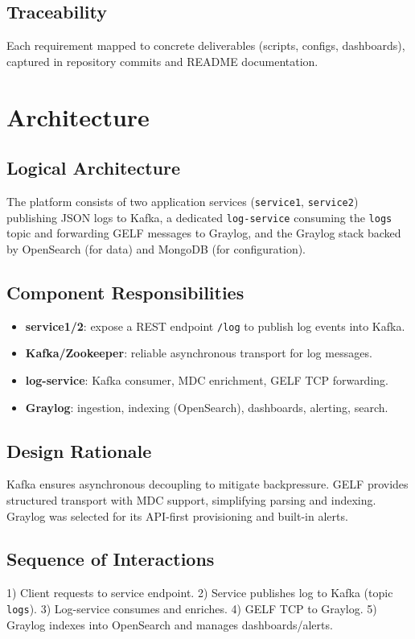 \documentclass[12pt,a4paper]{report}
\begin{document}
\section{Traceability}
Each requirement mapped to concrete deliverables (scripts, configs, dashboards), captured in repository commits and README documentation.

\chapter{Architecture}
\section{Logical Architecture}
The platform consists of two application services (\texttt{service1}, \texttt{service2}) publishing JSON logs to Kafka, a dedicated \texttt{log-service} consuming the \texttt{logs} topic and forwarding GELF messages to Graylog, and the Graylog stack backed by OpenSearch (for data) and MongoDB (for configuration).

\section{Component Responsibilities}
\begin{itemize}[leftmargin=1.2cm]
  \item \textbf{service1/2}: expose a REST endpoint \texttt{/log} to publish log events into Kafka.
  \item \textbf{Kafka/Zookeeper}: reliable asynchronous transport for log messages.
  \item \textbf{log-service}: Kafka consumer, MDC enrichment, GELF TCP forwarding.
  \item \textbf{Graylog}: ingestion, indexing (OpenSearch), dashboards, alerting, search.
\end{itemize}

\section{Design Rationale}
Kafka ensures asynchronous decoupling to mitigate backpressure. GELF provides structured transport with MDC support, simplifying parsing and indexing. Graylog was selected for its API-first provisioning and built-in alerts.

\section{Sequence of Interactions}
1) Client requests to service endpoint. 2) Service publishes log to Kafka (topic \texttt{logs}). 3) Log-service consumes and enriches. 4) GELF TCP to Graylog. 5) Graylog indexes into OpenSearch and manages dashboards/alerts.
\end{document}
